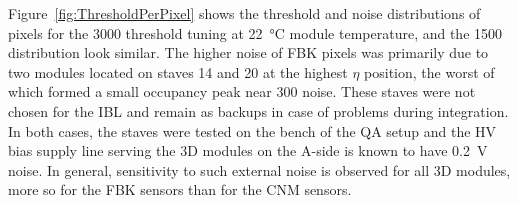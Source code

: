 Figure~\ref{fig:ThresholdPerPixel} shows the threshold and noise distributions of pixels for the \SI{3000}{\e} threshold tuning at \SI{22}{\celsius} module temperature, and the \SI{1500}{\e} distribution look similar.
The higher noise of FBK pixels was primarily due to two modules located on staves 14 and 20 at the highest $\eta$ position, the worst of which formed a small occupancy peak near \SI{300}{\e} noise. These staves were not chosen for the IBL and remain as backups in case of problems during integration. In both cases, the staves were tested on the bench of the QA setup and the HV bias supply line serving the 3D modules on the A-side is known to have \SI{0.2}{\volt} noise. In general, sensitivity to such external noise is observed for all 3D modules, more so for the FBK sensors than for the CNM sensors.
%
